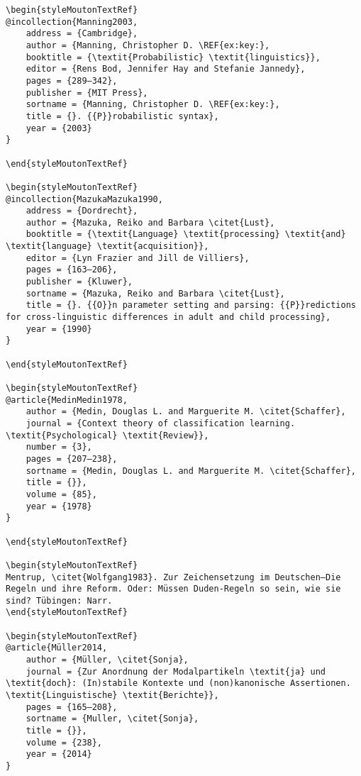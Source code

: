 \begin{styleMoutonHeadingRef}
\begin{verbatim}
\begin{styleMoutonTextRef}
@incollection{Manning2003,
	address = {Cambridge},
	author = {Manning, Christopher D. \REF{ex:key:},
	booktitle = {\textit{Probabilistic} \textit{linguistics}},
	editor = {Rens Bod, Jennifer Hay and Stefanie Jannedy},
	pages = {289–342},
	publisher = {MIT Press},
	sortname = {Manning, Christopher D. \REF{ex:key:},
	title = {}. {{P}}robabilistic syntax},
	year = {2003}
}

\end{styleMoutonTextRef}

\begin{styleMoutonTextRef}
@incollection{MazukaMazuka1990,
	address = {Dordrecht},
	author = {Mazuka, Reiko and Barbara \citet{Lust},
	booktitle = {\textit{Language} \textit{processing} \textit{and} \textit{language} \textit{acquisition}},
	editor = {Lyn Frazier and Jill de Villiers},
	pages = {163–206},
	publisher = {Kluwer},
	sortname = {Mazuka, Reiko and Barbara \citet{Lust},
	title = {}. {{O}}n parameter setting and parsing: {{P}}redictions for cross-linguistic differences in adult and child processing},
	year = {1990}
}

\end{styleMoutonTextRef}

\begin{styleMoutonTextRef}
@article{MedinMedin1978,
	author = {Medin, Douglas L. and Marguerite M. \citet{Schaffer},
	journal = {Context theory of classification learning. \textit{Psychological} \textit{Review}},
	number = {3},
	pages = {207–238},
	sortname = {Medin, Douglas L. and Marguerite M. \citet{Schaffer},
	title = {}},
	volume = {85},
	year = {1978}
}

\end{styleMoutonTextRef}

\begin{styleMoutonTextRef}
Mentrup, \citet{Wolfgang1983}. Zur Zeichensetzung im Deutschen—Die Regeln und ihre Reform. Oder: Müssen Duden-Regeln so sein, wie sie sind? Tübingen: Narr.
\end{styleMoutonTextRef}

\begin{styleMoutonTextRef}
@article{Müller2014,
	author = {Müller, \citet{Sonja},
	journal = {Zur Anordnung der Modalpartikeln \textit{ja} und \textit{doch}: (In)stabile Kontexte und (non)kanonische Assertionen. \textit{Linguistische} \textit{Berichte}},
	pages = {165–208},
	sortname = {Muller, \citet{Sonja},
	title = {}},
	volume = {238},
	year = {2014}
}


\end{verbatim}
\end{styleMoutonHeadingRef}
